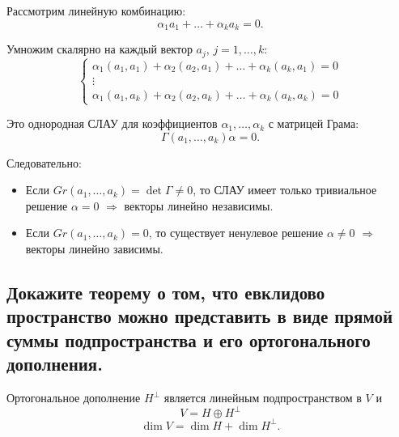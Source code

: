 \begin{Proof}
    Рассмотрим линейную комбинацию:
    \[
        \alpha_1 a_1 + \ldots + \alpha_k a_k = 0.
    \]

    Умножим скалярно на каждый вектор $a_j$, $j=1,\ldots,k$:
    \[
        \begin{cases}
            \alpha_1 (a_1,a_1) + \alpha_2 (a_2,a_1) + \ldots + \alpha_k(a_k,a_1) = 0\\
            \vdots\\
            \alpha_1 (a_1,a_k) + \alpha_2 (a_2,a_k) + \ldots + \alpha_k(a_k,a_k) = 0
        \end{cases}
    \]

    Это однородная СЛАУ для коэффициентов $\alpha_1,\ldots,\alpha_k$ с матрицей Грама:
    \[
        \Gamma(a_1,\ldots,a_k) \alpha = 0.
    \]

    Следовательно:
    \begin{itemize}
        \item Если $Gr(a_1,\ldots,a_k) = \det \Gamma \neq 0$, то СЛАУ имеет только тривиальное решение $\alpha = 0$ $\Rightarrow$ векторы линейно независимы.
        \item Если $Gr(a_1,\ldots,a_k) = 0$, то существует ненулевое решение $\alpha \neq 0$ $\Rightarrow$ векторы линейно зависимы.
    \end{itemize}
\end{Proof}
\subsection{Докажите теорему о том, что евклидово пространство можно представить в виде прямой суммы подпространства и его ортогонального дополнения.}

\begin{theorem}
    Ортогональное дополнение $H^{\perp}$ является линейным подпространством в $V$ и
    \[
        V = H \oplus H^{\perp}
    \]
    \[
        \dim V = \dim H + \dim H^{\perp}.
    \]
\end{theorem}

